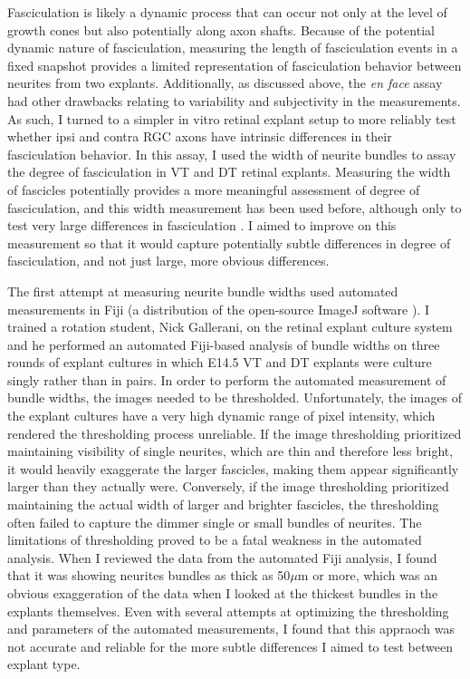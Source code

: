 \label{sec:BundleWidth}
Fasciculation is likely a dynamic process that can occur not only at the level of growth cones but also potentially along axon shafts.
Because of the potential dynamic nature of fasciculation, measuring the length of fasciculation events in a fixed snapshot provides a limited representation of fasciculation behavior between neurites from two explants.
Additionally, as discussed above, the \emph{en face} assay had other drawbacks relating to variability and subjectivity in the measurements.
As such, I turned to a simpler in vitro retinal explant setup to more reliably test whether ipsi and contra RGC axons have intrinsic differences in their fasciculation behavior.
In this assay, I used the width of neurite bundles to assay the degree of fasciculation in VT and DT retinal explants.
Measuring the width of fascicles potentially provides a more meaningful assessment of degree of fasciculation, and this width measurement has been used before, although only to test very large differences in fasciculation \cite{jaworski2012autocrine}.
I aimed to improve on this measurement so that it would capture potentially subtle differences in degree of fasciculation, and not just large, more obvious differences.

The first attempt at measuring neurite bundle widths used automated measurements in Fiji (a distribution of the open-source ImageJ software \cite{schindelin2012fiji}).
I trained a rotation student, Nick Gallerani, on the retinal explant culture system and he performed an automated Fiji-based analysis of bundle widths on three rounds of explant cultures in which E14.5 VT and DT explants were culture singly rather than in pairs.
In order to perform the automated measurement of bundle widths, the images needed to be thresholded.
Unfortunately, the images of the explant cultures have a very high dynamic range of pixel intensity, which rendered the thresholding process unreliable.
If the image thresholding prioritized maintaining visibility of single neurites, which are thin and therefore less bright, it would heavily exaggerate the larger fascicles, making them appear significantly larger than they actually were.
Conversely, if the image thresholding prioritized maintaining the actual width of larger and brighter fascicles, the thresholding often failed to capture the dimmer single or small bundles of neurites.
The limitations of thresholding proved to be a fatal weakness in the automated analysis.
When I reviewed the data from the automated Fiji analysis, I found that it was showing neurites bundles as thick as 50$\mu$m or more, which was an obvious exaggeration of the data when I looked at the thickest bundles in the explants themselves.
Even with several attempts at optimizing the thresholding and parameters of the automated measurements, I found that this appraoch was not accurate and reliable for the more subtle differences I aimed to test between explant type.

